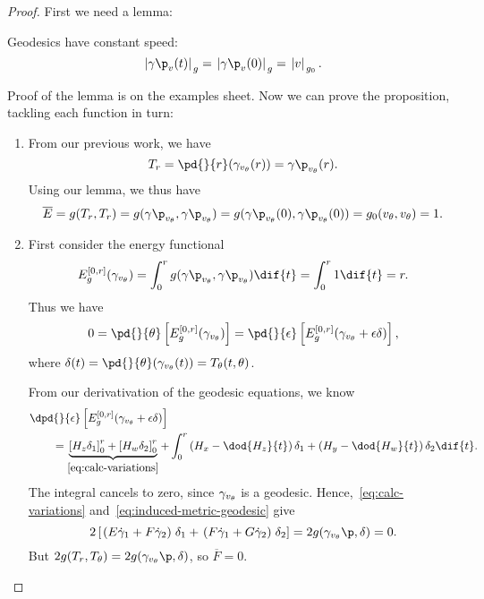 \begin{proof}
	First we need a lemma:

	\vspace{8pt}

	\begin{lemma}
		Geodesics have constant speed:
		\begin{equation*}
			\left.|\gamma\p_\vv(t)|\right._g = \left.|\gamma\p_\vv(0)|\right._g = \left.|\vv|\right._{g_0}.
		\end{equation*}
	\end{lemma}

	\vspace{-3pt}

	Proof of the lemma is on the examples sheet. Now we can prove the proposition, tackling each function in turn:
	\begin{enumerate}
		\item From our previous work, we have
		\begin{equation*}
			T_r = \pd{}{r}(\gamma_{\vv_\theta}(r)) = \gamma\p_{\vv_\theta}(r).
		\end{equation*}
		Using our lemma, we thus have
		\begin{equation*}
			\overline{E}
			= g(T_r,T_r)
			= g(\gamma\p_{\vv_\theta}, \gamma\p_{\vv_\theta})
			= g(\gamma\p_{\vv_\theta}(0), \gamma\p_{\vv_\theta}(0))
			= g_0(\vv_\theta, \vv_\theta)
			= 1.
		\end{equation*}

		\item First consider the energy functional
		\begin{equation*}
			E_g^{[0,r]}(\gamma_{\vv_\theta})
			= \int_0^r g(\gamma\p_{\vv_\theta}, \gamma\p_{\vv_\theta}) \dif{t}
			= \int_0^r 1 \dif{t}
			= r.
		\end{equation*}
		Thus we have
		\begin{equation*}
			0
			= \pd{}{\theta}\left[ E_g^{[0,r]}(\gamma_{\vv_\theta}) \right]
			= \pd{}{\epsilon}\left[ E_g^{[0,r]}(\gvt + \epsilon\delta) \right],
		\end{equation*}
		where $\delta(t) = \pd{}{\theta}(\gvt(t)) = T_\theta(t,\theta)$.

		From our derivativation of the geodesic equations, we know
		\begin{align}
			&\dpd{}{\epsilon}\left[ E_g^{[0,r]}(\gvt + \epsilon\delta) \right] \notag \\
			&\qquad= \underbrace{\left[ H_z \delta_1 \right]_0^r + \left[ H_w \delta_2 \right]_0^r}_{\eqref{eq:calc-variations}} + \int_0^r \left( H_x - \dod{H_z}{t} \right) \delta_1 + \left( H_y - \dod{H_w}{t} \right) \delta_2 \dif{t}.
			\label{eq:induced-metric-geodesic}
		\end{align}
		The integral cancels to zero, since $\gamma_{v_\theta}$ is a geodesic. Hence,~\eqref{eq:calc-variations} and~\eqref{eq:induced-metric-geodesic} give
		\begin{equation*}
			2 \left[ \left.(E\dgamma_1 + F\dgamma_2)\right.\delta_1 + \left.(F\dgamma_1 + G\dgamma_2)\right. \delta_2 \right]
			= 2g(\gvt\p, \delta) = 0.
		\end{equation*}
		But $2g(T_r,T_\theta) = 2g(\gvt\p,\delta)$, so $\overline{F}=0$.


\end{enumerate}
\end{proof}
